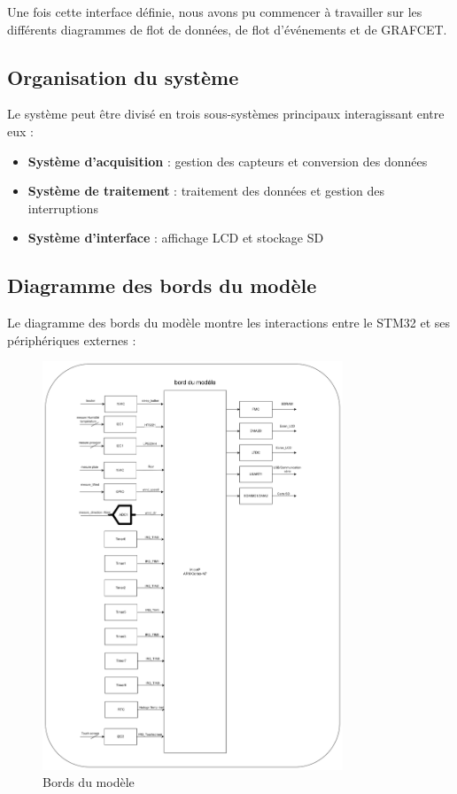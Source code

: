 \documentclass[12pt]{article}
\begin{document}
Une fois cette interface définie, nous avons pu commencer à travailler sur les différents diagrammes de flot de données, de flot d'événements et de GRAFCET.
\subsection{Organisation du système}
Le système peut être divisé en trois sous-systèmes principaux interagissant entre eux :
\begin{itemize}
    \item \textbf{Système d'acquisition} : gestion des capteurs et conversion des données
    \item \textbf{Système de traitement} : traitement des données et gestion des interruptions
    \item \textbf{Système d'interface} : affichage LCD et stockage SD
\end{itemize}

\subsection{Diagramme des bords du modèle}
Le diagramme des bords du modèle montre les interactions entre le STM32 et ses périphériques externes :

\begin{figure}[H]
    \capstart
    \centering
    \includegraphics[width=0.8\textwidth]{./images/bords_du_modele1.png}
    \caption{Bords du modèle}
    \label{fig:bords}
\end{figure}
\end{document}
